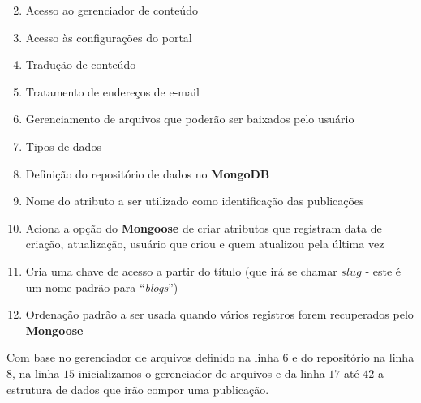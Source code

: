 \begin{enumerate}
    \setcounter{enumi}{1}
    \item Acesso ao gerenciador de conteúdo
    \item Acesso às configurações do portal
    \item Tradução de conteúdo
    \item Tratamento de endereços de e-mail
    \item Gerenciamento de arquivos que poderão ser baixados pelo usuário
    \item Tipos de dados
    \item Definição do repositório de dados no \textbf{MongoDB}
    \item Nome do atributo a ser utilizado como identificação das publicações
    \item Aciona a opção do \textbf{Mongoose} de criar atributos que registram data de criação, atualização, usuário que criou e quem atualizou pela última vez
    \item Cria uma chave de acesso a partir do título (que irá se chamar $slug$ - este é um nome padrão para ``\textit{blogs}'')
    \item Ordenação padrão a ser usada quando vários registros forem recuperados pelo \textbf{Mongoose}
\end{enumerate}

Com base no gerenciador de arquivos definido na linha $6$ e do repositório na linha $8$, na linha $15$ inicializamos o gerenciador de arquivos e da linha $17$ até $42$ a estrutura de dados que irão compor uma publicação.

